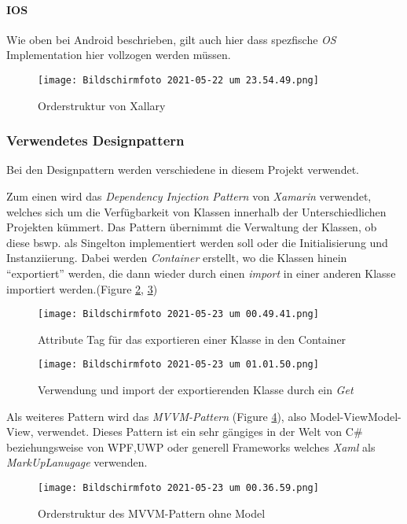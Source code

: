 \paragraph{IOS} Wie oben bei Android beschrieben, gilt auch hier dass spezfische \textit{OS} Implementation hier vollzogen werden müssen.
\begin{figure}[h]
    \centering
    \texttt{[image: Bildschirmfoto 2021-05-22 um 23.54.49.png]}
    \label{fig:Ordnerstruktur}
    \caption{Orderstruktur von Xallary}
\end{figure}
\subsubsection{Verwendetes Designpattern}
Bei den Designpattern werden verschiedene in diesem Projekt verwendet. 

Zum einen wird das 
\textit{Dependency Injection Pattern} von \textit{Xamarin} verwendet, welches sich um die Verfügbarkeit von Klassen innerhalb
der Unterschiedlichen Projekten kümmert. Das Pattern übernimmt die Verwaltung der Klassen, ob diese bswp. als Singelton implementiert werden soll oder
die Initialisierung und Instanziierung. Dabei werden \textit{Container} erstellt, wo die Klassen
hinein ``exportiert''  werden, die dann wieder durch einen \textit{import} in einer anderen Klasse
importiert werden.(Figure \ref{fig:IoC}, \ref{fig:IoCImport}) 
\begin{figure}[h]
    \centering
    \texttt{[image: Bildschirmfoto 2021-05-23 um 00.49.41.png]}
    \label{fig:IoC}
    \caption{Attribute Tag für das exportieren einer Klasse in den Container}
\end{figure}

\begin{figure}[h]
    \centering
    \texttt{[image: Bildschirmfoto 2021-05-23 um 01.01.50.png]}
    \label{fig:IoCImport}
    \caption{Verwendung und import der exportierenden Klasse durch ein \textit{Get} }
\end{figure}


Als weiteres Pattern wird das \textit{MVVM-Pattern} (Figure \ref{fig:MVVMPattern}), also Model-ViewModel-View, verwendet.
Dieses Pattern ist ein sehr gängiges in der Welt von C\# beziehungsweise von WPF,UWP oder generell Frameworks welches \textit{Xaml} als 
\textit{MarkUpLanugage} verwenden.
\begin{figure}[h]
    \centering
    \texttt{[image: Bildschirmfoto 2021-05-23 um 00.36.59.png]}
    \label{fig:MVVMPattern}
    \caption{Orderstruktur des MVVM-Pattern ohne Model}
\end{figure}


